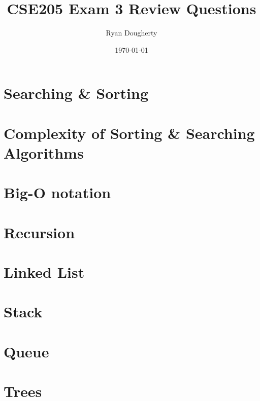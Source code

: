 \documentclass{article}
\title{CSE205 Exam 3 Review Questions}
\author{Ryan Dougherty}
\date{\today}
\begin{document}
\maketitle

\section{Searching \& Sorting}

\section{Complexity of Sorting \& Searching Algorithms}

\section{Big-O notation}

\section{Recursion}

\section{Linked List}

\section{Stack}

\section{Queue}

\section{Trees}
\end{document}
